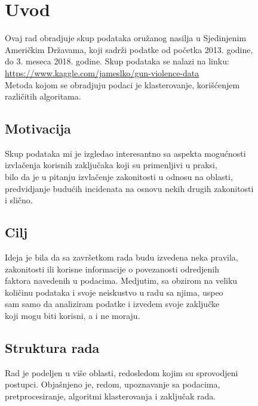 \documentclass[
	12pt,			
	openright,		
	oneside,			
	a4paper,		
	english,			
	]{article}
\begin{document}
\tableofcontents
\newpage

\section{Uvod}

Ovaj rad obradjuje skup podataka oružanog nasilja u Sjedinjenim \\ Američkim Državama, koji sadrži podatke od početka 2013. godine,\\ do 3. meseca 2018. godine.
Skup podataka se nalazi na linku: \\ \url{https://www.kaggle.com/jameslko/gun-violence-data}\\
Metoda kojom se obradjuju podaci je klasterovanje, korišćenjem \\
različitih algoritama.



\subsection{Motivacija}
Skup podataka mi je izgledao interesantno sa aspekta mogućnosti \\
izvlačenja korisnih zaključaka koji su primenljivi u praksi, \\
bilo da je u pitanju izvlačenje zakonitosti u odnosu na oblasti, \\
predvidjanje budućih incidenata na osnovu nekih drugih zakonitosti \\
i slično.

\subsection{Cilj}
Ideja je bila da sa završetkom rada budu izvedena neka pravila,\\ zakonitosti ili korisne informacije o povezanosti odredjenih\\
faktora navedenih u podacima. Medjutim, sa obzirom na veliku  \\
količinu podataka i svoje neiskustvo u radu sa njima, uspeo \\ 
sam samo da analiziram podatke i izvedem svoje zaključke \\
koji mogu biti korisni, a i ne moraju.

\subsection{Struktura rada}
Rad je podeljen u više oblasti, redosledom kojim su sprovodjeni \\
postupci. Objašnjeno je, redom, upoznavanje sa podacima, \\
pretprocesiranje, algoritmi klasterovanja i zaključak rada.
\end{document}
